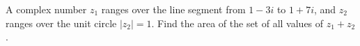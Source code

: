 A complex number $z_1$ ranges over the line segment from $1-3i$ to $1+7i$, and $z_2$ ranges over the unit circle $|z_2|=1$. Find the area of the set of all values of $z_1+z_2$.

